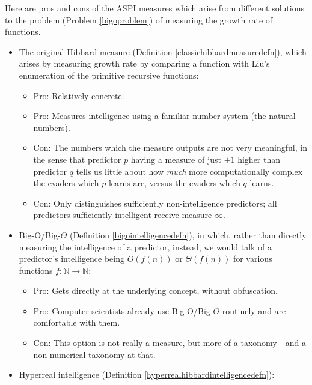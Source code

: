 \documentclass{article}
\begin{document}
Here are pros and cons of the ASPI measures which arise from different solutions
to the problem (Problem \ref{bigoproblem}) of measuring the growth rate of functions.

\begin{itemize}
    \item
    The original Hibbard measure (Definition \ref{classichibbardmeasuredefn}),
    which arises by measuring growth rate by comparing
    a function with Liu's enumeration \cite{liu1960enumeration} of the primitive
    recursive functions:
    \begin{itemize}
        \item
        Pro: Relatively concrete.
        \item
        Pro: Measures intelligence using a familiar number system (the natural numbers).
        \item
        Con: The numbers which the measure outputs are not very meaningful, in the sense
        that predictor $p$ having a measure of
        just $+1$ higher than predictor $q$ tells us little
        about how \emph{much} more computationally complex the evaders which $p$
        learns are, versus the evaders which $q$ learns.
        \item
        Con: Only distinguishes sufficiently non-intelligence predictors; all predictors
        sufficiently intelligent receive measure $\infty$.
    \end{itemize}
    \item
    Big-O/Big-$\Theta$ (Definition \ref{bigointelligencedefn}),
    in which, rather than directly measuring the intelligence of a predictor, instead, we
    would talk of a predictor's intelligence being $O(f(n))$ or $\Theta(f(n))$
    for various functions $f:\mathbb N\to\mathbb N$:
    \begin{itemize}
        \item
        Pro: Gets directly at the underlying concept, without obfuscation.
        \item
        Pro: Computer scientists already use Big-O/Big-$\Theta$ routinely
        and are comfortable with them.
        \item
        Con: This option is not really a measure, but more of a taxonomy---and a
        non-numerical taxonomy at that.
    \end{itemize}
    \item
    Hyperreal intelligence (Definition \ref{hyperrealhibbardintelligencedefn}):
    \begin{itemize}

\end{itemize}
\end{itemize}
\end{document}
